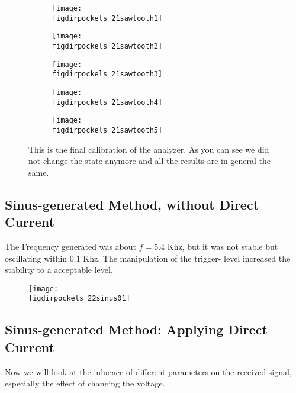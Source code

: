 \begin{figure}
    \begin{subfigure}[b]{\picwidth}
        \texttt{[image: \\figdirpockels 21sawtooth1]}
        \caption{}
    \end{subfigure}\qquad
    \begin{subfigure}[b]{\picwidth}
        \texttt{[image: \\figdirpockels 21sawtooth2]}
        \caption{}
    \end{subfigure}
    \begin{subfigure}[b]{\picwidth}
        \texttt{[image: \\figdirpockels 21sawtooth3]}
        \caption{}
    \end{subfigure}
    \begin{subfigure}[b]{\picwidth}
        \texttt{[image: \\figdirpockels 21sawtooth4]}
        \caption{}
    \end{subfigure}
    \begin{subfigure}[b]{\picwidth}
        \texttt{[image: \\figdirpockels 21sawtooth5]}
        \caption{}
    \end{subfigure}
    \caption{
        This is the final calibration of the analyzer. As you
        can see we did not change the state anymore and all the
        results are in general the same.
        }
    \label{fig:saw3}
\end{figure}
\flushleft
\clearpage
\subsection{Sinus-generated Method, without Direct Current}
The Frequency generated was about $f=5.4$ Khz, but it was not stable
but oscillating within $0.1$ Khz. The manipulation of the trigger-
level increased the stability to a acceptable level. 
\begin{figure}
\texttt{[image: \\figdirpockels 22sinus01]}
\end{figure}
\subsection{Sinus-generated Method: Applying Direct Current}
Now we will look at the inluence of different parameters on
the received signal, especially the effect of changing the
voltage. 
